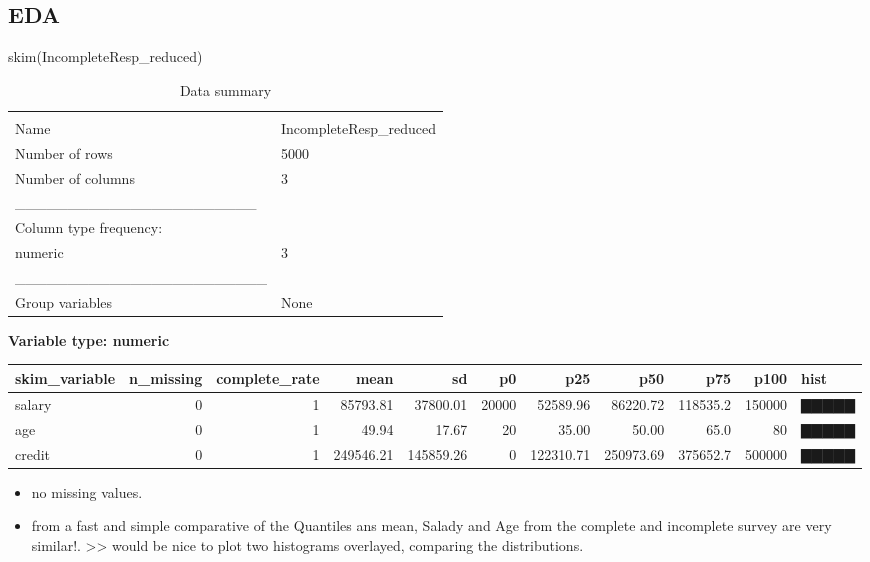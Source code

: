 \documentclass[
]{article}
\newenvironment{Shaded}{\begin{snugshade}}{\end{snugshade}}
\newcommand{\FunctionTok}[1]{\textcolor[rgb]{0.00,0.00,0.00}{#1}}
\newcommand{\NormalTok}[1]{#1}
\begin{document}
\hypertarget{eda-1}{%
\subsection{EDA}\label{eda-1}}

\begin{Shaded}
\begin{Highlighting}[]
\FunctionTok{skim}\NormalTok{(IncompleteResp\_reduced)}
\end{Highlighting}
\end{Shaded}

\begin{longtable}[]{@{}ll@{}}
\caption{Data summary}\tabularnewline
\toprule
& \\
\midrule
\endfirsthead
\toprule
& \\
\midrule
\endhead
Name & IncompleteResp\_reduced \\
Number of rows & 5000 \\
Number of columns & 3 \\
\_\_\_\_\_\_\_\_\_\_\_\_\_\_\_\_\_\_\_\_\_\_\_ & \\
Column type frequency: & \\
numeric & 3 \\
\_\_\_\_\_\_\_\_\_\_\_\_\_\_\_\_\_\_\_\_\_\_\_\_ & \\
Group variables & None \\
\bottomrule
\end{longtable}

\textbf{Variable type: numeric}

\begin{longtable}[]{@{}lrrrrrrrrrl@{}}
\toprule
skim\_variable & n\_missing & complete\_rate & mean & sd & p0 & p25 &
p50 & p75 & p100 & hist \\
\midrule
\endhead
salary & 0 & 1 & 85793.81 & 37800.01 & 20000 & 52589.96 & 86220.72 &
118535.2 & 150000 & ▇▇▇▇▇ \\
age & 0 & 1 & 49.94 & 17.67 & 20 & 35.00 & 50.00 & 65.0 & 80 & ▇▇▇▇▇ \\
credit & 0 & 1 & 249546.21 & 145859.26 & 0 & 122310.71 & 250973.69 &
375652.7 & 500000 & ▇▇▇▇▇ \\
\bottomrule
\end{longtable}

\begin{itemize}
\item
  no missing values.
\item
  from a fast and simple comparative of the Quantiles ans mean, Salady
  and Age from the complete and incomplete survey are very similar!.
  \textgreater\textgreater{} would be nice to plot two histograms
  overlayed, comparing the distributions.
\end{itemize}
\end{document}
